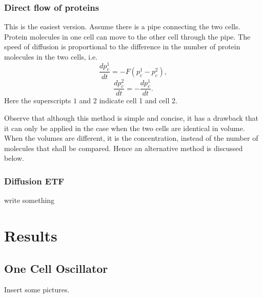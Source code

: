 \documentclass[12pt]{article}
\renewcommand{\(}{\left (}
\renewcommand{\)}{\right )}
\begin{document}
\subsubsection{Direct flow of proteins}
\hspace{5mm} This is the easiest version. Assume there is a pipe connecting the two cells. Protein molecules in one cell can move to the other cell through the pipe. The speed of diffusion is proportional to the difference in the number of protein molecules in the two cells, i.e.
\begin{equation}
	\frac{d {p_c^1}}{dt} = -F ({p_c^1 - p_c^2}),
\end{equation}
\begin{equation}
	\frac{d {p_c^2}}{dt} = -\frac{d {p_c^1}}{dt}.
\end{equation}
Here the superscripts $1$ and $2$ indicate cell 1 and cell 2.

Observe that although this method is simple and concise, it has a drawback that it can only be applied in the case when the two cells are identical in volume. When the volumes are different, it is the concentration, instead of the number of molecules that shall be compared. Hence an alternative method is discussed below.

\subsubsection{Diffusion ETF}
\hspace{5mm} write something

\section{Results}
\subsection{One Cell Oscillator}
\hspace{5mm} Insert some pictures.
\end{document}

